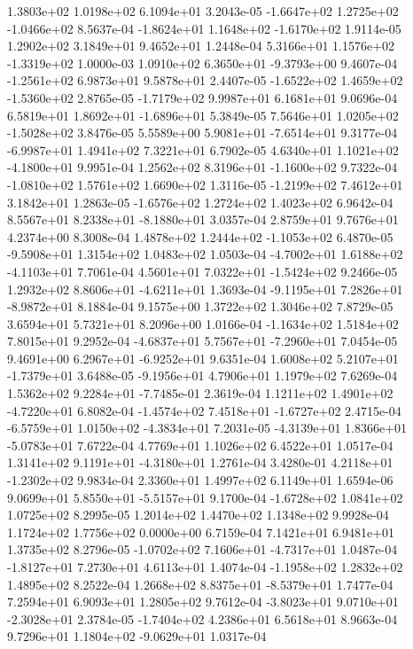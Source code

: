 1.3803e+02 1.0198e+02 6.1094e+01  3.2043e-05
-1.6647e+02  1.2725e+02 -1.0466e+02  8.5637e-04
-1.8624e+01  1.1648e+02 -1.6170e+02  1.9114e-05
1.2902e+02 3.1849e+01 9.4652e+01  1.2448e-04
 5.3166e+01  1.1576e+02 -1.3319e+02  1.0000e-03
 1.0910e+02  6.3650e+01 -9.3793e+00  9.4607e-04
-1.2561e+02  6.9873e+01  9.5878e+01  2.4407e-05
-1.6522e+02  1.4659e+02 -1.5360e+02  2.8765e-05
-1.7179e+02  9.9987e+01  6.1681e+01  9.0696e-04
 6.5819e+01  1.8692e+01 -1.6896e+01  5.3849e-05
 7.5646e+01  1.0205e+02 -1.5028e+02  3.8476e-05
 5.5589e+00  5.9081e+01 -7.6514e+01  9.3177e-04
-6.9987e+01  1.4941e+02  7.3221e+01  6.7902e-05
 4.6340e+01  1.1021e+02 -4.1800e+01  9.9951e-04
 1.2562e+02  8.3196e+01 -1.1600e+02  9.7322e-04
-1.0810e+02  1.5761e+02  1.6690e+02  1.3116e-05
-1.2199e+02  7.4612e+01  3.1842e+01  1.2863e-05
-1.6576e+02  1.2724e+02  1.4023e+02  6.9642e-04
 8.5567e+01  8.2338e+01 -8.1880e+01  3.0357e-04
2.8759e+01 9.7676e+01 4.2374e+00  8.3008e-04
 1.4878e+02  1.2444e+02 -1.1053e+02  6.4870e-05
-9.5908e+01  1.3154e+02  1.0483e+02  1.0503e-04
-4.7002e+01  1.6188e+02 -4.1103e+01  7.7061e-04
 4.5601e+01  7.0322e+01 -1.5424e+02  9.2466e-05
 1.2932e+02  8.8606e+01 -4.6211e+01  1.3693e-04
-9.1195e+01  7.2826e+01 -8.9872e+01  8.1884e-04
9.1575e+00 1.3722e+02 1.3046e+02  7.8729e-05
3.6594e+01 5.7321e+01 8.2096e+00  1.0166e-04
-1.1634e+02  1.5184e+02  7.8015e+01  9.2952e-04
-4.6837e+01  5.7567e+01 -7.2960e+01  7.0454e-05
 9.4691e+00  6.2967e+01 -6.9252e+01  9.6351e-04
 1.6008e+02  5.2107e+01 -1.7379e+01  3.6488e-05
-9.1956e+01  4.7906e+01  1.1979e+02  7.6269e-04
 1.5362e+02  9.2284e+01 -7.7485e-01  2.3619e-04
 1.1211e+02  1.4901e+02 -4.7220e+01  6.8082e-04
-1.4574e+02  7.4518e+01 -1.6727e+02  2.4715e-04
-6.5759e+01  1.0150e+02 -4.3834e+01  7.2031e-05
-4.3139e+01  1.8366e+01 -5.0783e+01  7.6722e-04
4.7769e+01 1.1026e+02 6.4522e+01  1.0517e-04
 1.3141e+02  9.1191e+01 -4.3180e+01  1.2761e-04
 3.4280e-01  4.2118e+01 -1.2302e+02  9.9834e-04
2.3360e+01 1.4997e+02 6.1149e+01  1.6594e-06
 9.0699e+01  5.8550e+01 -5.5157e+01  9.1700e-04
-1.6728e+02  1.0841e+02  1.0725e+02  8.2995e-05
1.2014e+02 1.4470e+02 1.1348e+02  9.9928e-04
1.1724e+02 1.7756e+02 0.0000e+00  6.7159e-04
7.1421e+01 6.9481e+01 1.3735e+02  8.2796e-05
-1.0702e+02  7.1606e+01 -4.7317e+01  1.0487e-04
-1.8127e+01  7.2730e+01  4.6113e+01  1.4074e-04
-1.1958e+02  1.2832e+02  1.4895e+02  8.2522e-04
 1.2668e+02  8.8375e+01 -8.5379e+01  1.7477e-04
7.2594e+01 6.9093e+01 1.2805e+02  9.7612e-04
-3.8023e+01  9.0710e+01 -2.3028e+01  2.3784e-05
-1.7404e+02  4.2386e+01  6.5618e+01  8.9663e-04
 9.7296e+01  1.1804e+02 -9.0629e+01  1.0317e-04

